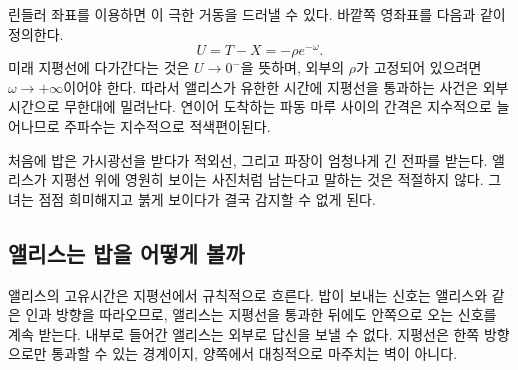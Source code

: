 린들러 좌표를 이용하면 이 극한 거동을 드러낼 수 있다. 바깥쪽 영좌표를 다음과 같이 정의한다.
\begin{equation}
U=T-X=-\rho e^{-\omega}.
\end{equation}
미래 지평선에 다가간다는 것은 \(U\to0^{-}\)을 뜻하며, 외부의 \(\rho\)가 고정되어 있으려면 \(\omega\to+\infty\)이어야 한다. 따라서 앨리스가 유한한 시간에 지평선을 통과하는 사건은 외부 시간으로 무한대에 밀려난다. 연이어 도착하는 파동 마루 사이의 간격은 지수적으로 늘어나므로 주파수는 지수적으로 적색편이된다.

처음에 밥은 가시광선을 받다가 적외선, 그리고 파장이 엄청나게 긴 전파를 받는다. 앨리스가 지평선 위에 영원히 보이는 사진처럼 남는다고 말하는 것은 적절하지 않다. 그녀는 점점 희미해지고 붉게 보이다가 결국 감지할 수 없게 된다.

\begin{classroomqa}
\end{classroomqa}

\begin{classroomqa}
\end{classroomqa}

\subsection{앨리스는 밥을 어떻게 볼까}

앨리스의 고유시간은 지평선에서 규칙적으로 흐른다. 밥이 보내는 신호는 앨리스와 같은 인과 방향을 따라오므로, 앨리스는 지평선을 통과한 뒤에도 안쪽으로 오는 신호를 계속 받는다. 내부로 들어간 앨리스는 외부로 답신을 보낼 수 없다. 지평선은 한쪽 방향으로만 통과할 수 있는 경계이지, 양쪽에서 대칭적으로 마주치는 벽이 아니다.

\begin{classroomqa}
\end{classroomqa}

